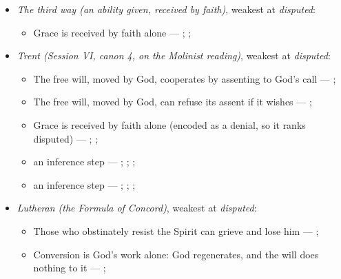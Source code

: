 \documentclass[11pt]{article}
\begin{document}
\begin{itemize}
\begin{itemize}
\end{itemize}
\item \emph{The third way (an ability given, received by faith)}, weakest at \emph{disputed}:
\begin{itemize}
\item Grace is received by faith alone --- \cite[Augsburg Confession IV.1–3]{concordia-triglotta-1921}; \cite[Sermon 1, III.1]{wesley-sermons-1872}; \cite[Trent, Session VI (1547), canon 9]{tanner-decrees-1990}
\end{itemize}
\item \emph{Trent (Session VI, canon 4, on the Molinist reading)}, weakest at \emph{disputed}:
\begin{itemize}
\item The free will, moved by God, cooperates by assenting to God’s call --- \cite[Trent, Session VI (1547), canon 4]{tanner-decrees-1990}; \cite[45]{waterworth-trent-1848}
\item The free will, moved by God, can refuse its assent if it wishes --- \cite[Trent, Session VI (1547), canon 4]{tanner-decrees-1990}; \cite[45]{waterworth-trent-1848}
\item Grace is received by faith alone (encoded as a denial, so it ranks disputed) --- \cite[Augsburg Confession IV.1–3]{concordia-triglotta-1921}; \cite[Sermon 1, III.1]{wesley-sermons-1872}; \cite[Trent, Session VI (1547), canon 9]{tanner-decrees-1990}
\item an inference step --- \cite[I-II q.111 a.2]{aquinas-summa-1920}; \cite[Canons of Dort, III/IV, art. 12]{schaff-creeds-christendom-3-1977}; \cite[Trent, Session VI (1547), canon 4]{tanner-decrees-1990}; \cite[45]{waterworth-trent-1848}
\item an inference step --- \cite[I-II q.10 a.4 ad 3]{aquinas-summa-1920}; \cite[I-II q.112 a.3]{aquinas-summa-1920}; \cite[Trent, Session VI (1547), canon 4]{tanner-decrees-1990}; \cite[45]{waterworth-trent-1848}
\end{itemize}
\item \emph{Lutheran (the Formula of Concord)}, weakest at \emph{disputed}:
\begin{itemize}
\item Those who obstinately resist the Spirit can grieve and lose him --- \cite[Solid Declaration II.83]{concordia-triglotta-1921}; \cite[Solid Declaration XI.42]{concordia-triglotta-1921}
\item Conversion is God’s work alone: God regenerates, and the will does nothing to it --- \cite[Solid Declaration II.89]{concordia-triglotta-1921}; \cite[Solid Declaration II.90]{concordia-triglotta-1921}

\end{itemize}
\end{itemize}
\end{document}

